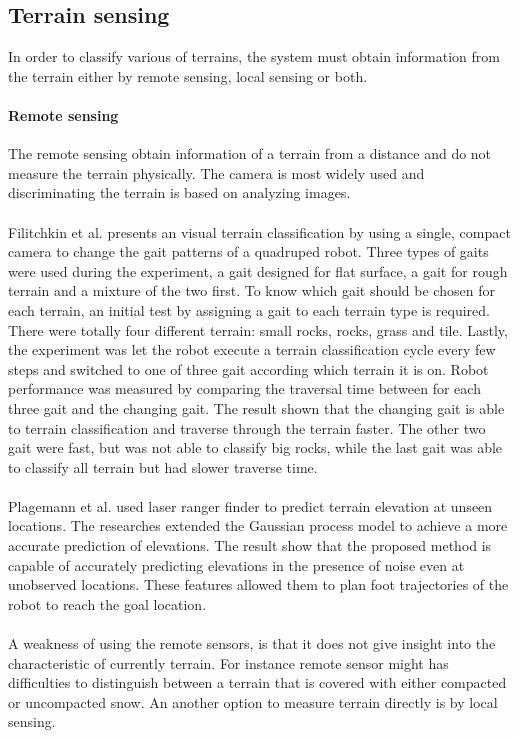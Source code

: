 \documentclass[USenglish]{ifimaster}  %
\begin{document}
	
	\subsection{Terrain sensing}
	In order to classify various of terrains, the system must obtain information from the terrain either by remote sensing, local sensing or both.
	
	\paragraph{Remote sensing}
	The remote sensing obtain information of a terrain from a distance and do not measure the terrain physically. The camera is most widely used and discriminating the terrain is based on analyzing images.
	\\
	\\ 
	Filitchkin et al. \cite{littleDog} presents an visual terrain classification by using a single, compact camera to change the gait patterns of a quadruped robot. Three types of gaits were used during the experiment, a gait designed for flat surface, a gait for rough terrain and a mixture of the two first. To know which gait should be chosen for each terrain, an initial test by assigning a gait to each terrain type is required. There were totally four different terrain: small rocks, rocks, grass and tile. Lastly, the experiment was let the robot execute a terrain classification cycle every few steps and switched to one of three gait according which terrain it is on. Robot performance was measured by comparing the traversal time between for each three gait and the changing gait. The result shown that the changing gait is able to terrain classification and traverse through the terrain faster. The other two gait were fast, but was not able to classify big rocks, while the last gait was able to classify all terrain but had slower traverse time.
	\\
	\\
	Plagemann et al. \cite{4651026} used laser ranger finder to predict terrain elevation at unseen locations.
	The researches extended the Gaussian process model to achieve a more accurate prediction of elevations. The result show that the proposed method is capable of accurately predicting elevations in the presence of noise even at unobserved locations. These features allowed them to plan foot trajectories of the robot to reach the goal location. 
	\\
	\\
	A weakness of using the remote sensors, is that it does not give insight into the characteristic of currently terrain. For instance remote sensor might has difficulties to distinguish between a terrain that is covered with either compacted or uncompacted snow. An another option to measure terrain directly is by local sensing. 
	
\end{document}
